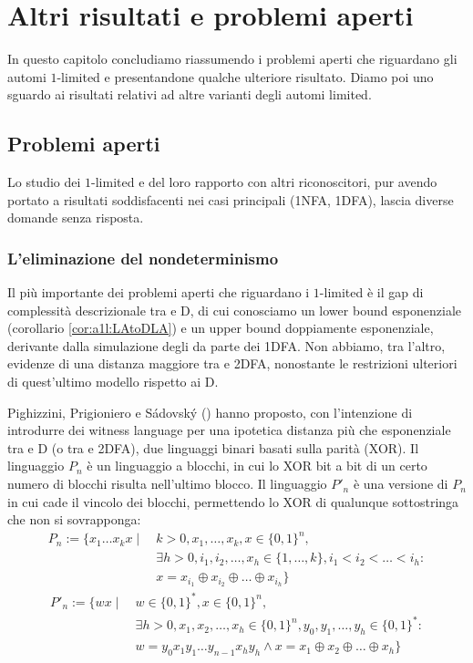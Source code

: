 \chapter{Altri risultati e problemi aperti}\label{cha:prob}
In questo capitolo concludiamo riassumendo i problemi aperti che riguardano gli automi $1$-limited e presentandone qualche ulteriore risultato. Diamo poi uno sguardo ai risultati relativi ad altre varianti degli automi limited.



\section{Problemi aperti}
Lo studio dei $1$-limited e del loro rapporto con altri riconoscitori, pur avendo portato a risultati soddisfacenti nei casi principali (1NFA, 1DFA), lascia diverse domande senza risposta.


\subsection{L'eliminazione del nondeterminismo}
Il più importante dei problemi aperti che riguardano i $1$-limited è il gap di complessità descrizionale tra  e D, di cui conosciamo un lower bound esponenziale (corollario \ref{cor:a1l:LAtoDLA}) e un upper bound doppiamente esponenziale, derivante dalla simulazione degli  da parte dei 1DFA. Non abbiamo, tra l'altro, evidenze di una distanza maggiore tra  e 2DFA, nonostante le restrizioni ulteriori di quest'ultimo modello rispetto ai D.

Pighizzini, Prigioniero e Sádovský (\cite{Pighizzini:22:limitedwitness}) hanno proposto, con l'intenzione di introdurre dei witness language per una ipotetica distanza più che esponenziale tra  e D (o tra  e 2DFA), due linguaggi binari basati sulla parità (XOR). Il linguaggio $P_n$ è un linguaggio a blocchi, in cui lo XOR bit a bit di un certo numero di blocchi risulta nell'ultimo blocco. Il linguaggio $P'_n$ è una versione di $P_n$ in cui cade il vincolo dei blocchi, permettendo lo XOR di qualunque sottostringa che non si sovrapponga:
\begin{align*}
	P_n := \{  x_1\dots x_kx \mid ~ & k>0, x_1,\dots,x_k,x\in\{0,1\}^n,                                \\
	                                & \exists h>0,i_1,i_2,\dots,x_h\in\{1,\dots,k\},i_1<i_2<\dots<i_h: \\
	                                & x=x_{i_1}\oplus x_{i_2}\oplus\dots\oplus x_{i_h}\}
\end{align*}
\begin{align*}
	P'_n := \{  wx \mid ~ & w\in\{0,1\}^*,x\in\{0,1\}^n,                                                \\
	                      & \exists h>0,x_1,x_2,\dots,x_h\in\{0,1\}^n,y_0,y_1,\dots,y_h\in\{0,1\}^*:    \\
	                      & w=y_0x_1y_1\dots y_{n-1}x_hy_h \land x=x_1\oplus x_2\oplus\dots\oplus x_h\}
\end{align*}

